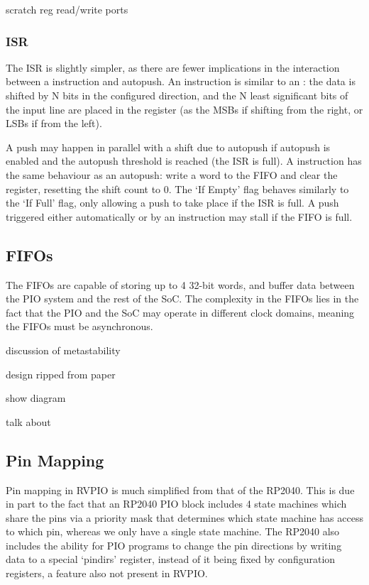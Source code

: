 scratch reg
read/write ports

\subsubsection{ISR}

The ISR is slightly simpler, as there are fewer implications in the interaction between a  instruction and autopush. An  instruction is similar to an : the data is shifted by N bits in the configured direction, and the N least significant bits of the input line are placed in the register (as the MSBs if shifting from the right, or LSBs if from the left).

A push may happen in parallel with a shift due to autopush if autopush is enabled and the autopush threshold is reached (the ISR is full). A  instruction has the same behaviour as an autopush: write a word to the FIFO and clear the register, resetting the shift count to 0. The `If Empty' flag behaves similarly to the `If Full' flag, only allowing a push to take place if the ISR is full. A push triggered either automatically or by an instruction may stall if the FIFO is full.

\subsection{FIFOs}

The FIFOs are capable of storing up to 4 32-bit words, and buffer data between the PIO system and the rest of the SoC. The complexity in the FIFOs lies in the fact that the PIO and the SoC may operate in different clock domains, meaning the FIFOs must be asynchronous.

discussion of metastability

design ripped from paper

show diagram

talk about


\subsection{Pin Mapping}

Pin mapping in RVPIO is much simplified from that of the RP2040. This is due in part to the fact that an RP2040 PIO block includes 4 state machines which share the pins via a priority mask that determines which state machine has access to which pin, whereas we only have a single state machine. The RP2040 also includes the ability for PIO programs to change the pin directions by writing data to a special `pindirs' register, instead of it being fixed by configuration registers, a feature also not present in RVPIO.

